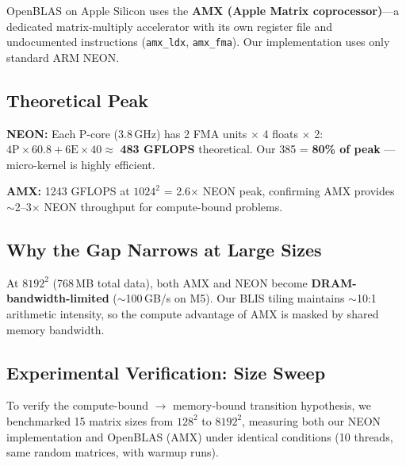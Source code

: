 \documentclass[11pt,a4paper]{article}
\begin{document}
OpenBLAS on Apple Silicon uses the \textbf{AMX (Apple Matrix coprocessor)}---a dedicated
matrix-multiply accelerator with its own register file and undocumented instructions
(\texttt{amx\_ldx}, \texttt{amx\_fma}). Our implementation uses only standard ARM NEON.

\subsection{Theoretical Peak}

\textbf{NEON:} Each P-core (3.8\,GHz) has 2 FMA units $\times$ 4 floats $\times$ 2:
$4\text{P}\times60.8 + 6\text{E}\times40 \approx$ \textbf{483 GFLOPS} theoretical.
Our 385 = \textbf{80\% of peak} --- micro-kernel is highly efficient.

\textbf{AMX:} 1243 GFLOPS at $1024^2$ = 2.6$\times$ NEON peak, confirming AMX
provides $\sim$2--3$\times$ NEON throughput for compute-bound problems.

\subsection{Why the Gap Narrows at Large Sizes}

At $8192^2$ (768\,MB total data), both AMX and NEON become
\textbf{DRAM-bandwidth-limited} ($\sim$100\,GB/s on M5).
Our BLIS tiling maintains $\sim$10:1 arithmetic intensity, so the compute advantage
of AMX is masked by shared memory bandwidth.

\subsection{Experimental Verification: Size Sweep}

To verify the compute-bound $\to$ memory-bound transition hypothesis,
we benchmarked 15 matrix sizes from $128^2$ to $8192^2$, measuring both
our NEON implementation and OpenBLAS (AMX) under identical conditions
(10 threads, same random matrices, with warmup runs).
\end{document}
